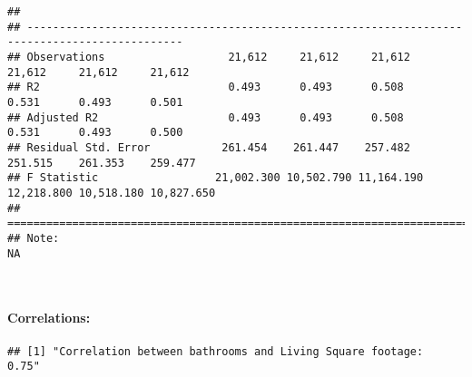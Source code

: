 \documentclass[
]{article}
\newenvironment{Shaded}{\begin{snugshade}}{\end{snugshade}}
\newcommand{\CommentTok}[1]{\textcolor[rgb]{0.56,0.35,0.01}{\textit{#1}}}
\newcommand{\DataTypeTok}[1]{\textcolor[rgb]{0.13,0.29,0.53}{#1}}
\newcommand{\DecValTok}[1]{\textcolor[rgb]{0.00,0.00,0.81}{#1}}
\newcommand{\KeywordTok}[1]{\textcolor[rgb]{0.13,0.29,0.53}{\textbf{#1}}}
\newcommand{\NormalTok}[1]{#1}
\newcommand{\OperatorTok}[1]{\textcolor[rgb]{0.81,0.36,0.00}{\textbf{#1}}}
\newcommand{\StringTok}[1]{\textcolor[rgb]{0.31,0.60,0.02}{#1}}
\begin{document}
\begin{verbatim}
##                                                                                               
## ----------------------------------------------------------------------------------------------
## Observations                   21,612     21,612     21,612     21,612     21,612     21,612  
## R2                             0.493      0.493      0.508      0.531      0.493      0.501   
## Adjusted R2                    0.493      0.493      0.508      0.531      0.493      0.500   
## Residual Std. Error           261.454    261.447    257.482    251.515    261.353    259.477  
## F Statistic                  21,002.300 10,502.790 11,164.190 12,218.800 10,518.180 10,827.650
## ==============================================================================================
## Note:                                                                                       NA
\end{verbatim}

~

\hypertarget{correlations}{%
\paragraph{Correlations:}\label{correlations}}

\begin{Shaded}
\end{Shaded}

\begin{verbatim}
## [1] "Correlation between bathrooms and Living Square footage:  0.75"
\end{verbatim}

\begin{Shaded}
\end{Shaded}
\end{document}
